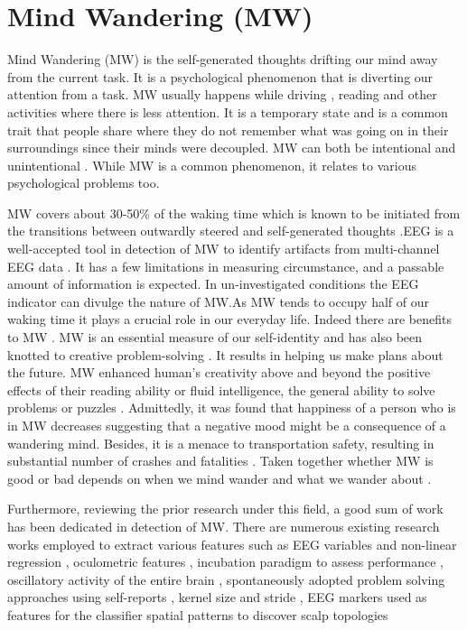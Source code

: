\section{Mind Wandering (MW)}
Mind Wandering (MW) is the self-generated thoughts drifting our mind away from the current task. It is a psychological phenomenon that is diverting our attention from a task. MW usually happens while driving \cite{baldwin2017detecting}, reading and other activities where there is less attention. It is a temporary state and is a common trait that people share where they do not remember what was going on in their surroundings since their minds were decoupled. MW can both be intentional and unintentional \cite{seli2017intentionality}. While MW is a common phenomenon, it relates to various psychological problems too.

MW covers about 30-50\% of the waking time which is known to be initiated from the transitions between outwardly steered and self-generated thoughts .EEG is a well-accepted tool in detection of MW to identify artifacts from multi-channel EEG data . It has a few limitations in measuring circumstance, and a passable amount of information is expected. In un-investigated conditions the EEG indicator can divulge the nature of MW.As MW tends to occupy half of our waking time it plays a crucial role in our everyday life. Indeed there are benefits to MW . MW is an essential measure of our self-identity and has also been knotted to creative problem-solving . It results in helping us make plans about the future. MW enhanced human’s creativity above and beyond the positive effects of their reading ability or fluid intelligence, the general ability to solve problems or puzzles . Admittedly, it was found that happiness of a person who is in MW decreases suggesting that a negative mood might be a consequence  of a wandering mind. Besides, it is a menace to transportation safety, resulting in substantial number of crashes and fatalities . Taken together whether MW is good or bad depends on when we mind wander and what we wander about .

Furthermore, reviewing the prior research under this field, a good sum of work has been dedicated in detection of MW. There are numerous existing research works employed to extract various features such as EEG variables and non-linear regression , oculometric features \cite{grandchamp2014oculometric}, incubation paradigm to assess performance , oscillatory activity of the entire brain , spontaneously adopted problem solving approaches using self-reports , kernel size and stride , EEG markers used as features for the classifier  spatial patterns to discover scalp topologies 

